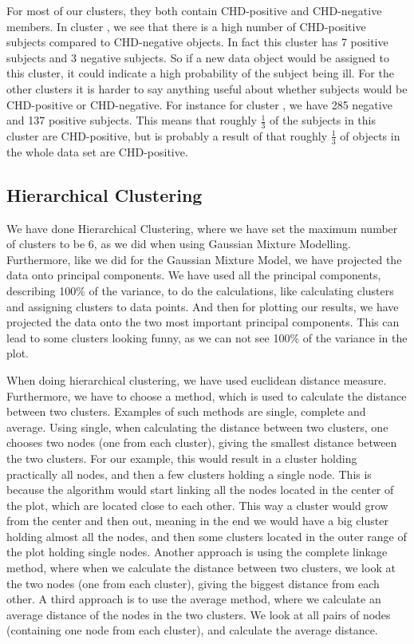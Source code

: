 For most of our clusters, they both contain CHD-positive and CHD-negative members. In cluster \CN, we see that there is a high number of CHD-positive subjects compared to CHD-negative objects. In fact this cluster has 7 positive subjects and 3 negative subjects. So if a new data object would be assigned to this cluster, it could indicate a high probability of the subject being ill. For the other clusters it is harder to say anything useful about whether subjects would be CHD-positive or CHD-negative. For instance for cluster \MDC, we have 285 negative and 137 positive subjects. This means that roughly $\frac{1}{3}$ of the subjects in this cluster are CHD-positive, but is probably a result of that roughly $\frac{1}{3}$ of objects in the whole data set are CHD-positive.


\subsection{Hierarchical Clustering}

We have done Hierarchical Clustering, where we have set the maximum number of clusters to be 6, as we did when using Gaussian Mixture Modelling. Furthermore, like we did for the Gaussian Mixture Model, we have projected the data onto principal components. We have used all the principal components, describing 100\% of the variance, to do the calculations, like calculating clusters and assigning clusters to data points. And then for plotting our results, we have projected the data onto the two most important principal components. This can lead to some clusters looking funny, as we can not see 100\% of the variance in the plot.

When doing hierarchical clustering, we have used euclidean distance measure. Furthermore, we have to choose a method, which is used to calculate the distance between two clusters. Examples of such methods are single, complete and average. Using single, when calculating the distance between two clusters, one chooses two nodes (one from each cluster), giving the smallest distance between the two clusters. For our example, this would result in a cluster holding practically all nodes, and then a few clusters holding a single node.  This is because the algorithm would start linking all the nodes located in the center of the plot, which are located close to each other. This way a cluster would grow from the center and then out, meaning in the end we would have a big cluster holding almost all the nodes, and then some clusters located in the outer range of the plot holding single nodes. Another approach is using the complete linkage method, where when we calculate the distance between two clusters, we look at the two nodes (one from each cluster), giving the biggest distance from each other. A third approach is to use the average method, where we calculate an average distance of the nodes in the two clusters. We look at all pairs of nodes (containing one node from each cluster), and calculate the average distance.

